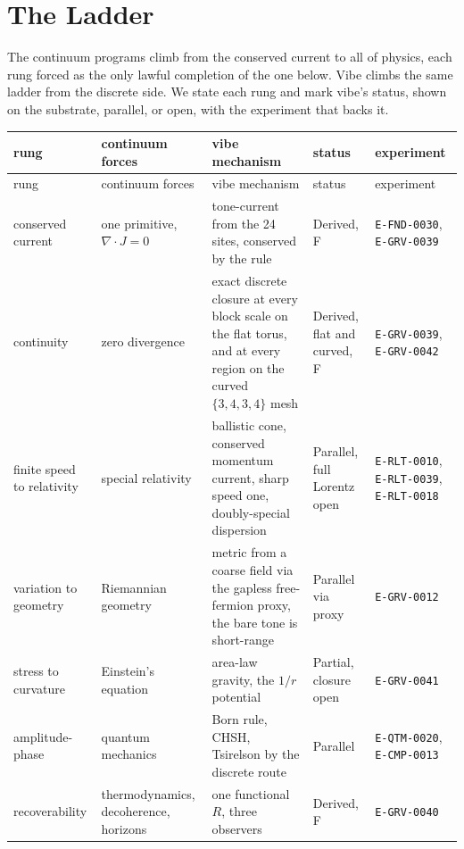 \section{The Ladder}

The continuum programs climb from the conserved current to all of physics, each rung forced as the only lawful completion of the one below. Vibe climbs the same ladder from the discrete side. We state each rung and mark vibe's status, shown on the substrate, parallel, or open, with the experiment that backs it.

\begin{longtable}{@{}>{\raggedright\arraybackslash}p{}>{\raggedright\arraybackslash}p{}>{\raggedright\arraybackslash}p{}>{\raggedright\arraybackslash}p{}>{\raggedright\arraybackslash}p{}@{}}
\toprule
rung & continuum forces & vibe mechanism & status & experiment \\
\midrule
\endfirsthead
\toprule
rung & continuum forces & vibe mechanism & status & experiment \\
\midrule
\endhead
\bottomrule
\endfoot
conserved current & one primitive, $\nabla\!\cdot J = 0$ & tone-current from the 24 sites, conserved by the rule & Derived, F & \texttt{E-FND-0030}, \texttt{E-GRV-0039} \\
continuity & zero divergence & exact discrete closure at every block scale on the flat torus, and at every region on the curved $\{3,4,3,4\}$ mesh & Derived, flat and curved, F & \texttt{E-GRV-0039}, \texttt{E-GRV-0042} \\
finite speed to relativity & special relativity & ballistic cone, conserved momentum current, sharp speed one, doubly-special dispersion & Parallel, full Lorentz open & \texttt{E-RLT-0010}, \texttt{E-RLT-0039}, \texttt{E-RLT-0018} \\
variation to geometry & Riemannian geometry & metric from a coarse field via the gapless free-fermion proxy, the bare tone is short-range & Parallel via proxy & \texttt{E-GRV-0012} \\
stress to curvature & Einstein's equation & area-law gravity, the $1/r$ potential & Partial, closure open & \texttt{E-GRV-0041} \\
amplitude-phase & quantum mechanics & Born rule, CHSH, Tsirelson by the discrete route & Parallel & \texttt{E-QTM-0020}, \texttt{E-CMP-0013} \\
recoverability & thermodynamics, decoherence, horizons & one functional $R$, three observers & Derived, F & \texttt{E-GRV-0040} \\

\end{longtable}
